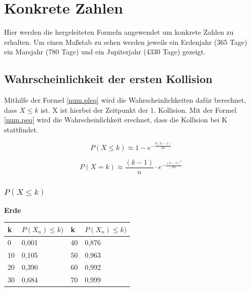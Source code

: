 \documentclass[../main.tex]{subfiles}
\begin{document}
\section{Konkrete Zahlen}
Hier werden die hergeleiteten Formeln angewendet um konkrete Zahlen zu erhalten. Um einen Maßstab zu sehen werden jeweils ein Erdenjahr (365 Tage) ein Marsjahr (780 Tage) und ein Jupiterjahr (4330 Tage) gezeigt.
\subsection{Wahrscheinlichkeit der ersten Kollision}

Mithilfe der Formel \ref{num.pleq} wird die Wahrscheinlichkeiten dafür berechnet, dass $X \leq k$ ist. X ist hierbei der Zeitpunkt der 1. Kollision. Mit der Formel \ref{num.peq} wird die Wahrscheinlichkeit erechnet, dass die Kollision bei K stattfindet.

\begin{equation}
 P(X \leq k) \approx 1 - e^{- \frac{k(k-1)}{2n}}
 \label{num.pleq}
\end{equation}

\begin{equation}
 P(X = k) \approx \frac{(k-1)}{n} \cdot e^{- \frac{(k-1)^2}{2n}}
 \label{num.peq}
\end{equation}

\subsubsection{$P(X \leq k)$}

\textbf{Erde}

\begin{table}[h]
\centering
\begin{tabular}{l|l|l|l}
k  & $P(X_{n}) \leq k)$ & k  & $P(X_{n}) \leq k)$ \\ \hline
0  & 0,001            & 40 & 0,876            \\
10 & 0,105            & 50 & 0,963            \\
20 & 0,390            & 60 & 0,992            \\
30 & 0,684            & 70 & 0,999
\end{tabular}
\end{table}
\end{document}

